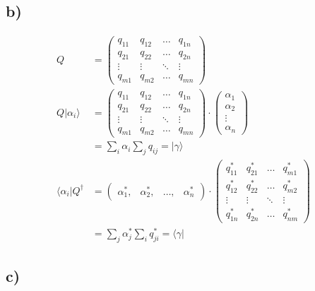 \subsection{b)}

    \begin{align*}
        Q &=
        \begin{pmatrix}
        q_{11} & q_{12} & \ldots & q_{1n}\\
        q_{21} & q_{22} & \ldots & q_{2n}\\
        \vdots & \vdots & \ddots & \vdots\\
        q_{m1} & q_{m2} & \ldots & q_{mn}
        \end{pmatrix}\\
        Q \vert \alpha_i \rangle &=
        \begin{pmatrix}
        q_{11} & q_{12} & \ldots & q_{1n}\\
        q_{21} & q_{22} & \ldots & q_{2n}\\
        \vdots & \vdots & \ddots & \vdots\\
        q_{m1} & q_{m2} & \ldots & q_{mn}
        \end{pmatrix} \cdot 
        \begin{pmatrix}
            \alpha_1\\
            \alpha_2\\
            \vdots\\
            \alpha_n
        \end{pmatrix}\\
        &= \sum_{i} \alpha_i \sum_{j} q_{ij} = \vert \gamma \rangle\\
        \langle \alpha_i \vert Q^{\dagger} &=
        \begin{pmatrix}
            \alpha_1^*, & \alpha_2^*, & \ldots, & \alpha_n^*
        \end{pmatrix} \cdot 
        \begin{pmatrix}
        q_{11}^* & q_{21}^* & \ldots & q_{m1}^*\\
        q_{12}^* & q_{22}^* & \ldots & q_{m2}^*\\
        \vdots & \vdots & \ddots & \vdots\\
        q_{1n}^* & q_{2n}^* & \ldots & q_{nm}^*
        \end{pmatrix}\\
        &= \sum_{j} \alpha_j^* \sum_{i} q_{ji}^* = \langle \gamma \vert
    \end{align*}

\subsection{c)}

